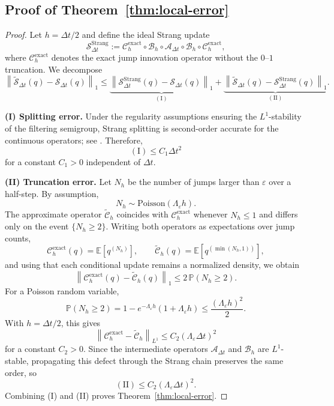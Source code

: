 \documentclass{article}
\newcommand{\E}{\mathbb{E}}
\begin{document}
\subsection{Proof of Theorem~\ref{thm:local-error}}\label{app:approx-local}
\begin{proof}
Let $h=\Delta t/2$ and define the ideal Strang update
\[
\mathcal{S}_{\Delta t}^{\mathrm{Strang}}
:=
\mathcal{C}_{h}^{\mathrm{exact}}
\circ
\mathcal{B}_{h}
\circ
\mathcal{A}_{\Delta t}
\circ
\mathcal{B}_{h}
\circ
\mathcal{C}_{h}^{\mathrm{exact}},
\]
where $\mathcal{C}_{h}^{\mathrm{exact}}$ denotes the exact jump innovation operator without the $0$--$1$ truncation. We decompose
\[
\left\lVert
\widetilde{\mathcal{S}}_{\Delta t}(q)-\mathcal{S}_{\Delta t}(q)
\right\rVert_1
\le
\underbrace{
\left\lVert
\mathcal{S}_{\Delta t}^{\mathrm{Strang}}(q)-\mathcal{S}_{\Delta t}(q)
\right\rVert_1
}_{\mathrm{(I)}}
+
\underbrace{
\left\lVert
\widetilde{\mathcal{S}}_{\Delta t}(q)-\mathcal{S}_{\Delta t}^{\mathrm{Strang}}(q)
\right\rVert_1
}_{\mathrm{(II)}}.
\]

\textbf{(I) Splitting error.}
Under the regularity assumptions ensuring the $L^1$-stability of the filtering semigroup, Strang splitting is second-order accurate for the continuous operators; see \citep{strang1968construction,bensoussan1990approximation}. Therefore,
\[
\mathrm{(I)} \le C_1 \Delta t^2
\]
for a constant $C_1>0$ independent of $\Delta t$.

\textbf{(II) Truncation error.}
Let $N_h$ be the number of jumps larger than $\varepsilon$ over a half-step. By assumption,
\[
N_h \sim \mathrm{Poisson}(\Lambda_{\varepsilon} h).
\]
The approximate operator $\widetilde{\mathcal{C}}_h$ coincides with $\mathcal{C}_{h}^{\mathrm{exact}}$ whenever $N_h \le 1$ and differs only on the event $\{N_h \ge 2\}$. Writing both operators as expectations over jump counts,
\[
\mathcal{C}_{h}^{\mathrm{exact}}(q)=\E[q^{(N_h)}],
\qquad
\widetilde{\mathcal{C}}_h(q)=\E[q^{(\min(N_h,1))}],
\]
and using that each conditional update remains a normalized density, we obtain
\[
\left\lVert
\mathcal{C}_{h}^{\mathrm{exact}}(q)-\widetilde{\mathcal{C}}_h(q)
\right\rVert_1
\le
2\,\mathbb{P}(N_h \ge 2).
\]
For a Poisson random variable,
\[
\mathbb{P}(N_h \ge 2)
=
1-e^{-\Lambda_{\varepsilon} h}(1+\Lambda_{\varepsilon} h)
\le
\frac{(\Lambda_{\varepsilon} h)^2}{2}.
\]
With $h=\Delta t/2$, this gives
\[
\left\lVert
\mathcal{C}_{h}^{\mathrm{exact}}-\widetilde{\mathcal{C}}_h
\right\rVert_{L^1}
\le
C_2(\Lambda_{\varepsilon}\Delta t)^2
\]
for a constant $C_2>0$. Since the intermediate operators $\mathcal{A}_{\Delta t}$ and $\mathcal{B}_h$ are $L^1$-stable, propagating this defect through the Strang chain preserves the same order, so
\[
\mathrm{(II)} \le C_2(\Lambda_{\varepsilon}\Delta t)^2.
\]
Combining (I) and (II) proves Theorem~\ref{thm:local-error}.
\end{proof}
\end{document}
